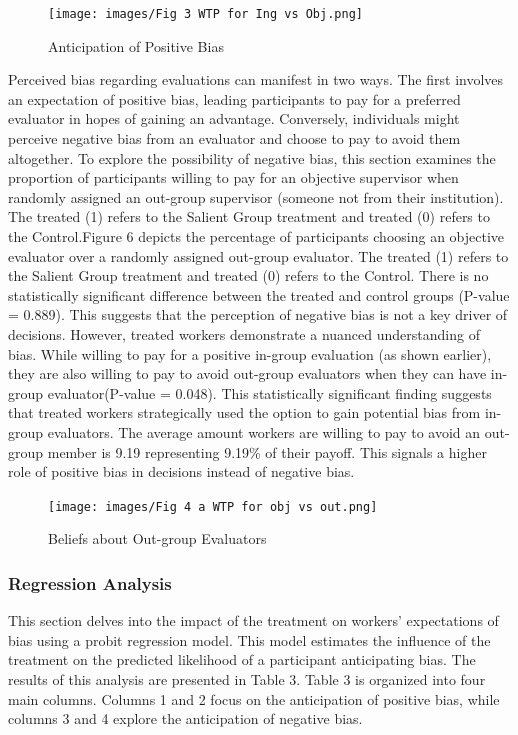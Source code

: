 \begin{figure}[H]
 \captionsetup{justification=raggedright,singlelinecheck=false}
\caption{Anticipation of Positive Bias}
\texttt{[image: images/Fig 3 WTP for Ing vs Obj.png]} 
\end{figure}

Perceived bias regarding evaluations can manifest in two ways. The first involves an expectation of positive bias, leading participants to pay for a preferred evaluator in hopes of gaining an advantage. Conversely, individuals might perceive negative bias from an evaluator and choose to pay to avoid them altogether. To explore the possibility of negative bias, this section examines the proportion of participants willing to pay for an objective supervisor when randomly assigned an out-group supervisor (someone not from their institution). The treated (1) refers to the Salient Group treatment and treated (0) refers to the Control.Figure 6 depicts the percentage of participants choosing an objective evaluator over a randomly assigned out-group evaluator. The treated (1) refers to the Salient Group treatment and treated (0) refers to the Control. There is no statistically significant difference between the treated and control groups (P-value = 0.889). This suggests that the perception of negative bias is not a key driver of decisions. However, treated workers demonstrate a nuanced understanding of bias. While willing to pay for a positive in-group evaluation (as shown earlier), they are also willing to pay to avoid out-group evaluators  when they can have in-group evaluator(P-value = 0.048). This statistically significant finding suggests that treated workers strategically used the option to gain potential bias from in-group evaluators. The average amount workers are willing to pay to avoid an out-group member is 9.19 representing 9.19\% of their payoff. This signals a higher role of positive bias in decisions instead of negative bias.


\begin{figure}[H]
 \captionsetup{justification=raggedright,singlelinecheck=false}
\caption{Beliefs about Out-group Evaluators}
\texttt{[image: images/Fig 4 a WTP for obj vs out.png]} 
\end{figure}

\subsubsection{Regression Analysis}

This section delves into the impact of the treatment on workers' expectations of bias using a probit regression model. This model estimates the influence of the treatment on the predicted likelihood of a participant anticipating bias. The results of this analysis are presented in Table 3. Table 3 is organized into four main columns. Columns 1 and 2 focus on the anticipation of positive bias, while columns 3 and 4 explore the anticipation of negative bias.


